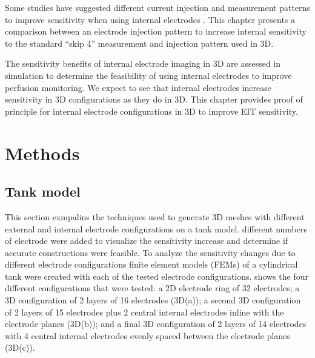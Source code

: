 Some studies have suggested different current injection and measurement patterns
to improve sensitivity when using internal electrodes \parencite{nasehi_tehrani_modelling_2012}.
This chapter presents a comparison between
an electrode injection pattern to increase
internal sensitivity to the standard ``skip 4''
measurement and injection pattern used in 3D.

The sensitivity benefits of internal electrode imaging in 3D are assessed
in simulation to determine the feasibility of using internal electrodes 
to improve perfusion monitoring. 
We expect to see that internal electrodes increase sensitivity in 3D configurations 
as they do in 3D.
This chapter provides proof of principle for internal electrode configurations 
in 3D to 
improve EIT sensitivity.


\section{Methods}

\subsection{Tank model}
This section exmpalins the techniques used to 
generate 3D meshes with different external and internal 
electrode configurations on a tank model. 
different numbers of electrode were added to visualize the sensitivity increase 
and determine if accurate constructions were feasible. 
To analyze the sensitivity changes due to different electrode 
configurations finite element models (FEMs) of a cylindrical tank were 
created with each of the tested electrode configurations.  shows the four 
different configurations that were tested: a 2D 
electrode ring of 32 electrodes; a 3D configuration of 2 layers of 16 
electrodes (3D(a)); a second 3D configuration of 2 layers of 15 electrodes 
plus 2 central internal electrodes inline with the electrode planes (3D(b)); and a final 3D configuration of 
2 layers of 14 electrodes with 4 central internal electrodes evenly spaced between the electrode planes (3D(c)).

